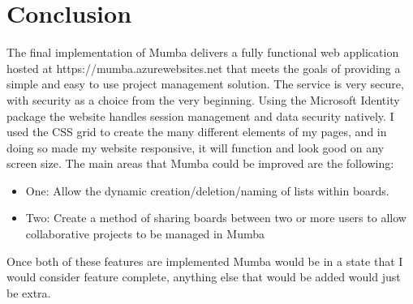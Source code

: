 \documentclass[letterpaper]{article}
\begin{document}
\section{Conclusion}
The final implementation of Mumba delivers a fully functional web application hosted at https://mumba.azurewebsites.net that meets the goals of providing a simple and easy to use project management solution. The service is very secure, with security as a choice from the very beginning. Using the Microsoft Identity package the website handles session management and data security natively. I used the CSS grid to create the many different elements of my pages, and in doing so made my website responsive, it will function and look good on any screen size. The main areas that Mumba could be improved are the following:
\begin{itemize}
  \item One: Allow the dynamic creation/deletion/naming of lists within boards.
  \item Two: Create a method of sharing boards between two or more users to allow collaborative projects to be managed in Mumba
\end{itemize}
Once both of these features are implemented Mumba would be in a state that I would consider feature complete, anything else that would be added would just be extra.
\end{document}

